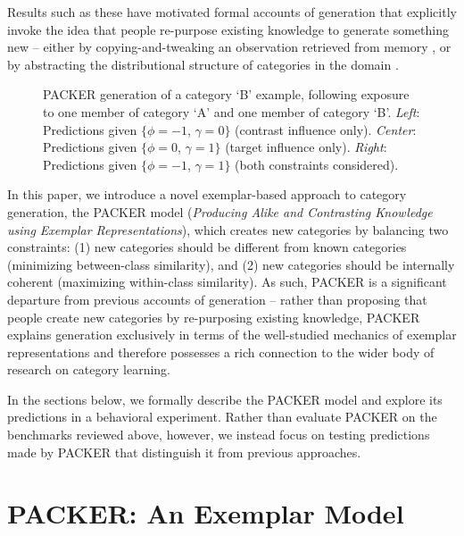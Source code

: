 \documentclass[10pt,letterpaper]{article}
\newcommand\inputpgf[2]{{
\let\pgfimageWithoutPath\pgfimage
\renewcommand{\pgfimage}[2][]{\pgfimageWithoutPath[##1]{#1/##2}}

}}
\begin{document}
Results such as these have motivated formal accounts of generation that explicitly invoke the idea that people re-purpose existing knowledge to generate something new -- either by copying-and-tweaking an observation retrieved from memory \citep{ward2002role,ward1995s}, or by abstracting the distributional structure of categories in the domain \citep{jern2013probabilistic}.


\begin{figure*}
    \begin{center}
    \inputpgf{figs/}{example-prob-spaces.pgf}
    \caption{PACKER generation of a category `B' example, following exposure to one member of category `A' and one member of category `B'. \textit{Left}: Predictions given $\{\phi = -1$, $\gamma = 0\}$ (contrast influence only). \textit{Center}: Predictions given $\{\phi = 0$, $\gamma = 1\}$ (target influence only).  \textit{Right}: Predictions given $\{\phi = -1$, $\gamma = 1\}$ (both constraints considered).  }
    \label{fig:example-prob-spaces}
    \end{center}
\end{figure*}

In this paper, we introduce a novel exemplar-based approach to category generation, the PACKER model (\textit{Producing Alike and Contrasting Knowledge using Exemplar Representations}), which creates new categories by balancing two constraints: (1) new categories should be different from known categories (minimizing between-class similarity), and (2) new categories should be internally coherent (maximizing within-class similarity). As such, PACKER is a significant departure from previous accounts of generation -- rather than proposing that people create new categories by re-purposing existing knowledge, PACKER explains generation exclusively in terms of the well-studied mechanics of exemplar representations and therefore possesses a rich connection to the wider body of research on category learning.

In the sections below, we formally describe the PACKER model and explore its predictions in a behavioral experiment. Rather than evaluate PACKER on the benchmarks reviewed above, however, we instead focus on testing predictions made by PACKER that distinguish it from previous approaches.


\section{PACKER: An Exemplar Model}
\end{document}
